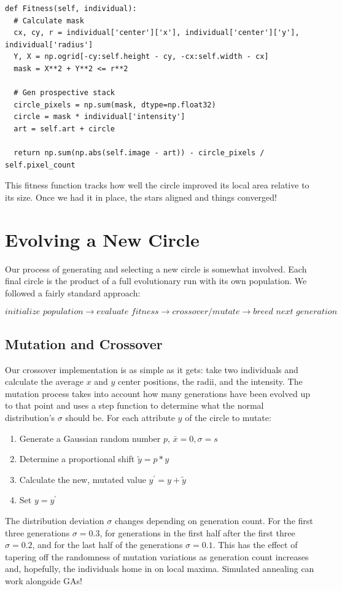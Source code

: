 \documentclass[12pt]{article}
\begin{document}
\begin{verbatim}
def Fitness(self, individual):
  # Calculate mask
  cx, cy, r = individual['center']['x'], individual['center']['y'], individual['radius']
  Y, X = np.ogrid[-cy:self.height - cy, -cx:self.width - cx]
  mask = X**2 + Y**2 <= r**2                
  
  # Gen prospective stack
  circle_pixels = np.sum(mask, dtype=np.float32)
  circle = mask * individual['intensity']
  art = self.art + circle

  return np.sum(np.abs(self.image - art)) - circle_pixels / self.pixel_count
\end{verbatim}

This fitness function tracks how well the circle improved its local area relative to its size. Once we had it in place, the stars aligned and things converged!

\section*{Evolving a New Circle}
Our process of generating and selecting a new circle is somewhat involved. Each final circle is the product of a full evolutionary run with its own population. We followed a fairly standard approach:

$$
\textit{initialize population}
\rightarrow\textit{evaluate fitness}
\rightarrow\textit{crossover/mutate}
\rightarrow\textit{breed next generation}
$$

\subsection*{Mutation and Crossover}
Our crossover implementation is as simple as it gets: take two individuals and calculate the average $x$ and $y$ center positions, the radii, and the intensity. The mutation process takes into account how many generations have been evolved up to that point and uses a step function to determine what the normal distribution's $\sigma$ should be. For each attribute $y$ of the circle to mutate:
\begin{enumerate}
\item Generate a Gaussian random number $p$, $\bar{x} = 0, \sigma = s$
\item Determine a proportional shift $\tilde{y} = p*y$
\item Calculate the new, mutated value $y^{\prime} = y + \tilde{y}$
\item Set $y = y^{\prime}$ 
\end{enumerate}
The distribution deviation $\sigma$ changes depending on generation count. For the first three generations $\sigma = 0.3$, for generations in the first half after the first three $\sigma = 0.2$, and for the last half of the generations $\sigma = 0.1$. This has the effect of tapering off the randomness of mutation variations as generation count increases and, hopefully, the individuals home in on local maxima. Simulated annealing can work alongside GAs!
\end{document}
